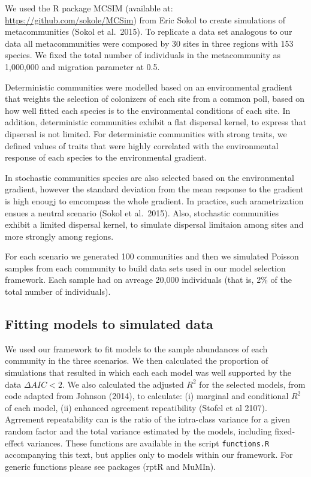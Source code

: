 We used the R package MCSIM (available at:
\url{https://github.com/sokole/MCSim}) from Eric Sokol to create
simulations of
metacommunities %
(Sokol et al.~2015). To replicate a data set analogous to our data all
metacommunities were composed by 30 sites in three regions with 153
species. We fixed the total number of individuals in the metacommunity
as 1,000,000 and migration parameter at 0.5.

Deterministic communities
were modelled based on an environmental gradient that weights the
selection of colonizers of each site from a common poll, based on how
well fitted each species is to the environmental conditions of each
site.  In addition, deterministic communities exhibit a flat dispersal
kernel, to express that dipsersal is not limited.  For deterministic
communities with strong traits, we defined values of traits that were
highly correlated with the environmental response of each species to
the environmental gradient.

In stochastic communities species are also selected based on the
environmental gradient, however the standard deviation from the mean
response to the gradient is high enougj to emcompass the whole
gradient.  In practice, such arametrization ensues a neutral scenario
(Sokol et al.~2015). Also, stochastic communities exhibit a limited
dispersal kernel, to simulate dispersal limitaion among sites and more
strongly among regions.

For each scenario we generated 100 communities and then we simulated
Poisson samples from each community to build data sets used in our
model selection framework. Each sample had on avreage 20,000
individuals (that is, 2\% of the total number of individuals).

\subsection*{Fitting models to simulated
data}\label{fitting-models-to-simulated-data}

We used our framework to fit models to the sample abundances of each
community in the three scenarios. We then calculated the proportion of
simulations that resulted in which each each model was well supported
by the data \(\Delta{AIC} < 2\). We also calculated the adjusted
\(R^{2}\) for the selected models, from code adapted from Johnson
(2014), to calculate: (i) marginal and conditional \(R^{2}\) of each
model, (ii) enhanced agreement repeatibility (Stofel et al
2107). Agrrement repeatability can is the ratio of the intra-class
variance for a given random factor and the total variance estimated by
the models, including fixed-effect variances. These functions are
available in the script \texttt{functions.R} accompanying this text, but
applies only to models within our framework. %
For generic functions
please see packages (rptR and MuMIn).

